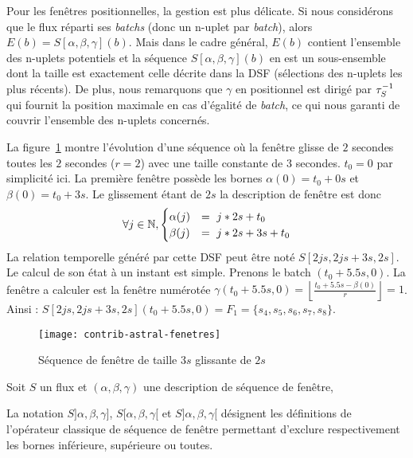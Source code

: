 Pour les fenêtres positionnelles, la gestion est plus délicate. Si nous considérons que le flux réparti ses \textit{batchs} (donc un n-uplet par \textit{batch}), alors $E(b) = S[\alpha,\beta,\gamma](b)$. Mais dans le cadre général, $E(b)$ contient l'ensemble des n-uplets potentiels et la séquence $S[\alpha,\beta,\gamma](b)$ en est un sous-ensemble dont la taille est exactement celle décrite dans la DSF (sélections des n-uplets les plus récents). De plus, nous remarquons que $\gamma$ en positionnel est dirigé par $\tau^{-1}_S$ qui fournit la position maximale en cas d'égalité de \textit{batch}, ce qui nous garanti de couvrir l'ensemble des n-uplets concernés.

	
\begin{example}
	La figure~\ref{fig:contrib:astral:fenetres} montre l'évolution d'une séquence où la fenêtre glisse de $2$ secondes toutes les $2$ secondes ($r=2$) avec une taille constante de $3$ secondes. $t_0 = 0$ par simplicité ici. 
La première fenêtre possède les bornes $\alpha(0) = t_0+ 0s$ et $\beta(0) =t_0+3s$. Le glissement étant de $2s$ la description de fenêtre est donc $$\forall j \in \mathbb{N}, \begin{cases} \alpha(j)  & =\ j*2s+t_0 \\ \beta(j) & = \ j*2s+3s+t_0\end{cases}$$
La relation temporelle généré par cette DSF peut être noté $S[2js,2js+3s,2s]$.  Le calcul de son état à un instant est simple. Prenons le batch $(t_0+5.5s,0)$. La fenêtre a calculer est la fenêtre numérotée $\gamma(t_0+5.5s,0) = \left\lfloor \frac{t_0+5.5s-\beta(0)}{r}\right\rfloor = 1$. Ainsi : $S[2js,2js+3s,2s](t_0+5.5s,0) = F_1 = \{s_4,s_5,s_6,s_7,s_8\}$.
\end{example}
\begin{figure}[ht]
	\centering
	\texttt{[image: contrib-astral-fenetres]}
	\caption{Séquence de fenêtre de taille $3s$ glissante de $2s$}\label{fig:contrib:astral:fenetres}
\end{figure}

\begin{defi}\label{def:exclufenetre}
    Soit $S$ un flux et $(\alpha,\beta,\gamma)$ une description de séquence de fenêtre,

    La notation $S]\alpha,\beta,\gamma]$, $S[\alpha,\beta,\gamma[$ et $S]\alpha,\beta,\gamma[$ désignent les définitions de l'opérateur classique de séquence de fenêtre permettant d'exclure respectivement les bornes inférieure, supérieure ou toutes.
\end{defi}

